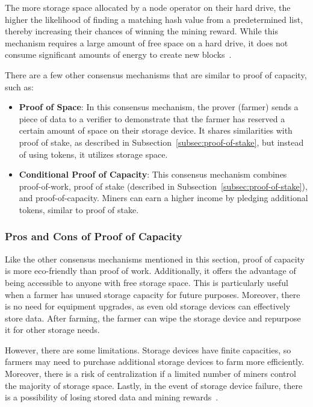 The more storage space allocated by a node operator on their hard drive, the higher the likelihood of finding a matching hash value from a predetermined list, thereby increasing their chances of winning the mining reward.
While this mechanism requires a large amount of free space on a hard drive, it does not consume significant amounts of energy to create new blocks~\cite{chia-whitepaper,geeksforgeeks-poc}.

There are a few other consensus mechanisms that are similar to proof of capacity, such as:

\begin{itemize}
    \item \textbf{Proof of Space}: In this consensus mechanism, the prover (farmer) sends a piece of data to a verifier to demonstrate that the farmer has reserved a certain amount of space on their storage device.
    It shares similarities with proof of stake, as described in Subsection~\ref{subsec:proof-of-stake}, but instead of using tokens, it utilizes storage space.
    \item \textbf{Conditional Proof of Capacity}: This consensus mechanism combines proof-of-work, proof of stake (described in Subsection~\ref{subsec:proof-of-stake}), and proof-of-capacity.
    Miners can earn a higher income by pledging additional tokens, similar to proof of stake.
\end{itemize}

\subsubsection{Pros and Cons of Proof of Capacity}
Like the other consensus mechanisms mentioned in this section, proof of capacity is more eco-friendly than proof of work.
Additionally, it offers the advantage of being accessible to anyone with free storage space.
This is particularly useful when a farmer has unused storage capacity for future purposes.
Moreover, there is no need for equipment upgrades, as even old storage devices can effectively store data.
After farming, the farmer can wipe the storage device and repurpose it for other storage needs.

However, there are some limitations.
Storage devices have finite capacities, so farmers may need to purchase additional storage devices to farm more efficiently.
Moreover, there is a risk of centralization if a limited number of miners control the majority of storage space.
Lastly, in the event of storage device failure, there is a possibility of losing stored data and mining rewards~\cite{geeksforgeeks-poc}.

